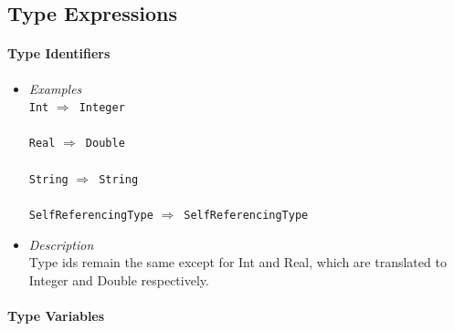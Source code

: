 \documentclass[diploma]{softlab-thesis}
\def\lra{$\Longrightarrow$\ }
\begin{document}
\subsection{Type Expressions}

\paragraph{Type Identifiers}

\begin{itemize}
\item
\textit{Examples}\\

\verb|Int| \lra \verb|Integer|\\\\
\verb|Real| \lra \verb|Double|\\\\
\verb|String| \lra \verb|String|\\\\
\verb|SelfReferencingType| \lra \verb|SelfReferencingType|\\
\item
\textit{Description}\\

Type ids remain the same except for Int and Real, which are translated to
Integer and Double respectively.

\end{itemize}

\paragraph{Type Variables}
\end{document}
